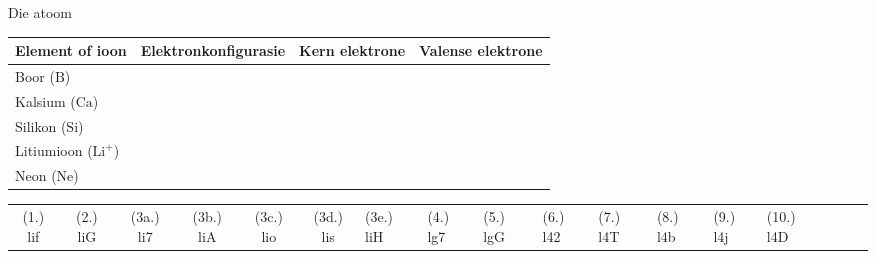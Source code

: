 \begin{eocexercises}{Die atoom}
\begin{enumerate}[noitemsep, label=\textbf{\arabic*}. ]
\begin{table}[H]
\begin{center}
    \noindent
      \begin{tabular}{|l|l|l|l|}\hline
        Element of ioon &
        Elektronkonfigurasie &
        Kern elektrone &
        Valense elektrone \\ \hline
        Boor ($\text{B}$) &
         &
         &
       \\ \hline
        Kalsium ($\text{Ca}$) &
         &
         &
     \\ \hline
        Silikon ($\text{Si}$) &
         &
         &
       \\ \hline
        Litiumioon ($\text{Li}^{+}$) &
         &
         &
      \\ \hline
        Neon ($\text{Ne}$) &
         &
         &
     \\ \hline
    \end{tabular}
      \end{center}
\end{table}
    \par
\end{enumerate}

\practiceinfo
\begin{tabular}[h]{cccccc}
 (1.) lif  &  (2.) liG  &  (3a.) li7  &  (3b.) liA  &  (3c.) lio  &  (3d.) lis  &  (3e.) liH  &  (4.) lg7  &  (5.) lgG  &  (6.) l42  &  (7.) l4T  &  (8.) l4b  &  (9.) l4j  &  (10.) l4D  &  & &  &
\end{tabular}

\end{eocexercises}

